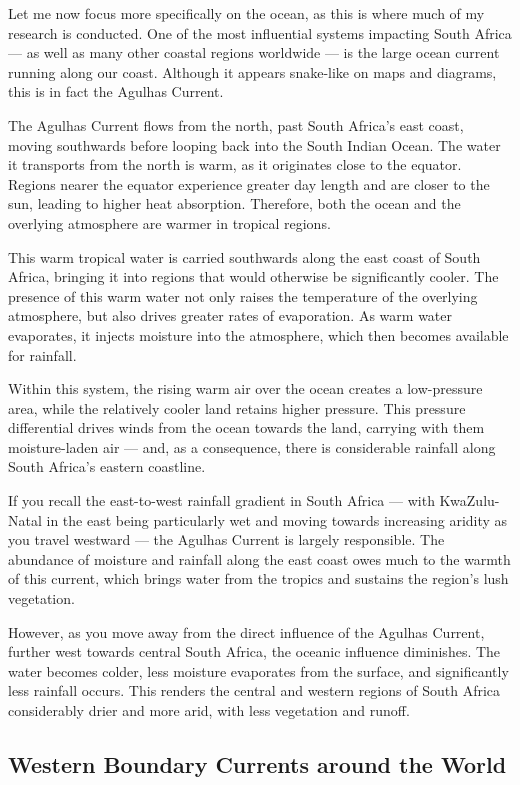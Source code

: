 \documentclass[
  10pt,
]{book}
\begin{document}
Let me now focus more specifically on the ocean, as this is where much
of my research is conducted. One of the most influential systems
impacting South Africa --- as well as many other coastal regions
worldwide --- is the large ocean current running along our coast.
Although it appears snake-like on maps and diagrams, this is in fact the
Agulhas Current.

The Agulhas Current flows from the north, past South Africa's east
coast, moving southwards before looping back into the South Indian
Ocean. The water it transports from the north is warm, as it originates
close to the equator. Regions nearer the equator experience greater day
length and are closer to the sun, leading to higher heat absorption.
Therefore, both the ocean and the overlying atmosphere are warmer in
tropical regions.

This warm tropical water is carried southwards along the east coast of
South Africa, bringing it into regions that would otherwise be
significantly cooler. The presence of this warm water not only raises
the temperature of the overlying atmosphere, but also drives greater
rates of evaporation. As warm water evaporates, it injects moisture into
the atmosphere, which then becomes available for rainfall.

Within this system, the rising warm air over the ocean creates a
low-pressure area, while the relatively cooler land retains higher
pressure. This pressure differential drives winds from the ocean towards
the land, carrying with them moisture-laden air --- and, as a
consequence, there is considerable rainfall along South Africa's eastern
coastline.

If you recall the east-to-west rainfall gradient in South Africa ---
with KwaZulu-Natal in the east being particularly wet and moving towards
increasing aridity as you travel westward --- the Agulhas Current is
largely responsible. The abundance of moisture and rainfall along the
east coast owes much to the warmth of this current, which brings water
from the tropics and sustains the region's lush vegetation.

However, as you move away from the direct influence of the Agulhas
Current, further west towards central South Africa, the oceanic
influence diminishes. The water becomes colder, less moisture evaporates
from the surface, and significantly less rainfall occurs. This renders
the central and western regions of South Africa considerably drier and
more arid, with less vegetation and runoff.

\subsection{Western Boundary Currents around the
World}\label{western-boundary-currents-around-the-world}
\end{document}

